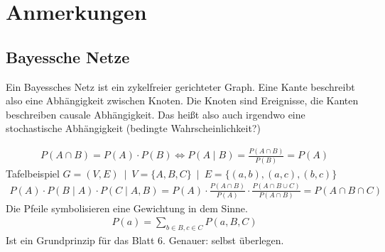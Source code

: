 \setcounter{chapter}{5}
\chapter{Anmerkungen}

\section{Bayessche Netze}

Ein Bayessches Netz ist ein zykelfreier gerichteter Graph. Eine Kante beschreibt also eine Abhängigkeit zwischen Knoten. Die Knoten sind Ereignisse, die Kanten beschreiben causale Abhängigkeit. Das heißt also auch irgendwo eine stochastische Abhängigkeit (bedingte Wahrscheinlichkeit?)

\begin{align*}P(A\cap B) = P(A)\cdot P(B) \Leftrightarrow P(A\mid B) = \frac{P(A\cap B)}{P(B)}= P(A)
\end{align*}
Tafelbeispiel $G = (V,E) ~\mid~ V = \{A,B,C\}~\mid~ E= \{(a,b),(a,c),(b,c)\}$
\begin{align*}
P(A) \cdot P(B\mid A) \cdot P(C\mid A,B) = P(A) \cdot \frac{P(A\cap B)}{P(A)} \cdot \frac{P(A\cap B\cup C)}{P(A\cap B)} = P(A\cap B\cap C)
\end{align*}
Die Pfeile symbolisieren eine Gewichtung in dem Sinne.
\begin{align*}
	P(a) = \sum_{b\in B,c\in C} P(a,B,C)
\end{align*}
Ist ein Grundprinzip für das Blatt 6. Genauer: selbst überlegen. 